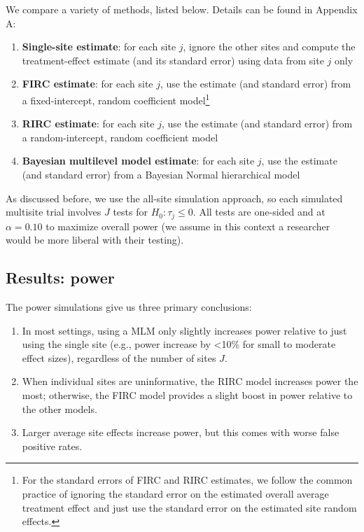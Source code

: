 \documentclass[]{article}
\begin{document}
We compare a variety of methods, listed below. Details can be found in Appendix A:
\begin{enumerate}
	\item \textbf{Single-site estimate}: for each site $j$, ignore the other sites and compute the treatment-effect estimate (and its standard error) using data from site $j$ only
	\item \textbf{FIRC estimate}: for each site $j$, use the estimate (and standard error) from a fixed-intercept, random coefficient model\footnote{For the standard errors of FIRC and RIRC estimates, we follow the common practice of ignoring the standard error on the estimated overall average treatment effect and just use the standard error on the estimated site random effects.}
	\item \textbf{RIRC estimate}: for each site $j$, use the estimate (and standard error) from a random-intercept, random coefficient model
	\item \textbf{Bayesian multilevel model estimate}: for each site $j$, use the estimate (and standard error) from a Bayesian Normal hierarchical model
\end{enumerate}

As discussed before, we use the all-site simulation approach, so each simulated multisite trial involves $J$ tests for $H_0: \tau_j \leq 0$.
All tests are one-sided and at $\alpha=0.10$ to maximize overall power (we assume in this context a researcher would be more liberal with their testing).

\subsection{Results: power}

The power simulations give us three primary conclusions:
\begin{enumerate}
	\item In most settings, using a MLM only slightly increases power relative to just using the single site (e.g., power increase by <10\% for small to moderate effect sizes), regardless of the number of sites $J$.
	\item When individual sites are uninformative, the RIRC model increases power the most; otherwise, the FIRC model provides a slight boost in power relative to the other models.
	\item Larger average site effects increase power, but this comes with worse false positive rates.
\end{enumerate}
\end{document}
